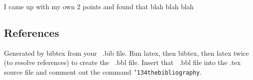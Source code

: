 \documentclass{acm_proc_article-sp}
\begin{document}
I came up with my own 2 points and found that blah blah blah


 

\subsection{References}
Generated by bibtex from your ~.bib file.  Run latex,
then bibtex, then latex twice (to resolve references)
to create the ~.bbl file.  Insert that ~.bbl file into
the .tex source file and comment out
the command \texttt{{\char'134}thebibliography}.
\balancecolumns
\end{document}
